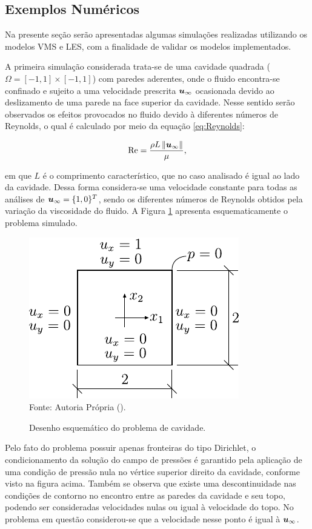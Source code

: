 \subsection{Exemplos Numéricos} \label{ExemplosMT}

Na presente seção serão apresentadas algumas simulações realizadas utilizando os modelos VMS e LES, com a finalidade de validar os modelos implementados.

A primeira simulação considerada trata-se de uma cavidade quadrada ($\Omega=[-1,1]\times[-1,1]$) com paredes aderentes, onde o fluido encontra-se confinado e sujeito a uma velocidade prescrita $\boldsymbol{u}_\infty$ ocasionada devido ao deslizamento de uma parede na face superior da cavidade. Nesse sentido serão observados os efeitos provocados no fluido devido à diferentes números de Reynolds, o qual é calculado por meio da equação \ref{eq:Reynolds}:

\begin{equation}
    \mathrm{Re}=\frac{\rho L\left\lVert{\boldsymbol{u}_\infty}\right\lVert}{\mu}\text{,}
    \label{eq:Reynolds}
\end{equation}

\noindent em que $L$ é o comprimento característico, que no caso analisado é igual ao lado da cavidade. Dessa forma considera-se uma velocidade constante para todas as análises de $\boldsymbol{u}_\infty=\{1,0\}^T$, sendo os diferentes números de Reynolds obtidos pela variação da viscosidade do fluido. A Figura \ref{fig:cavity} apresenta esquematicamente o problema simulado.

\begin{figure}[h]
    \centering
    \caption{Desenho esquemático do problema de cavidade.}
    \includegraphics[width=.35\linewidth]{Figuras/Cavity/cavidade.pdf}
    \\Fonte: Autoria Própria (\the\year).
    \label{fig:cavity}
\end{figure}

Pelo fato do problema possuir apenas fronteiras do tipo Dirichlet, o condicionamento da solução do campo de pressões é garantido pela aplicação de uma condição de pressão nula no vértice superior direito da cavidade, conforme visto na figura acima.  Também se observa que existe uma descontinuidade nas condições de contorno no encontro entre as paredes da cavidade e seu topo, podendo ser consideradas velocidades nulas ou igual à velocidade do topo. No problema em questão considerou-se que a velocidade nesse ponto é igual à $\boldsymbol{u}_\infty$.

